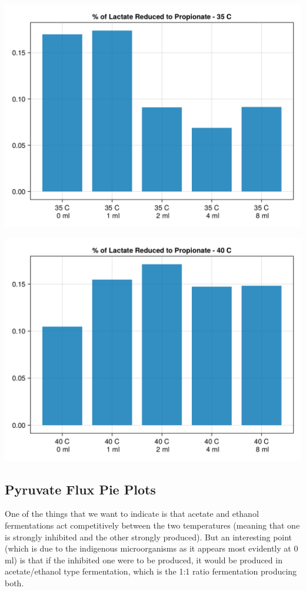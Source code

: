 \documentclass[11pt]{article}
\begin{document}
\begin{center}
\includegraphics[width=.9\linewidth]{../plots/metabolic_results/propionate_flux_35.png}
\end{center}

\begin{center}
\includegraphics[width=.9\linewidth]{../plots/metabolic_results/propionate_flux_40.png}
\end{center}

\subsection{Pyruvate Flux Pie Plots}
\label{sec:org692dc50}
One of the things that we want to indicate is that acetate and ethanol fermentations act competitively between the two temperatures (meaning that one is strongly inhibited and the other strongly produced). But an interesting point (which is due to the indigenous microorganisms as it appears most evidently at 0 ml) is that if the inhibited one were to be produced, it would be produced in acetate/ethanol type fermentation, which is the 1:1 ratio fermentation producing both.  
\end{document}
